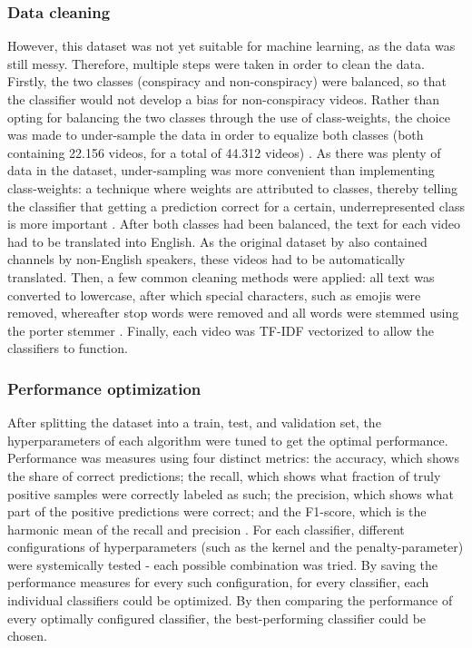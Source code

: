 \documentclass[../main.tex]{subfiles}
\begin{document}
\subsubsection{Data cleaning}
However, this dataset was not yet suitable for machine learning, as the data was still messy. Therefore, multiple steps were taken in order to clean the data. Firstly, the two classes (conspiracy and non-conspiracy) were balanced, so that the classifier would not develop a bias for non-conspiracy videos. Rather than opting for balancing the two classes through the use of class-weights, the choice was made to under-sample the data in order to equalize both classes (both containing 22.156 videos, for a total of 44.312 videos) \citep{lemaitre2017imbalanced}. As there was plenty of data in the dataset, under-sampling was more convenient than implementing class-weights: a technique where weights are attributed to classes, thereby telling the classifier that getting a prediction correct for a certain, underrepresented class is more important \citep{sun}. After both classes had been balanced, the text for each video had to be translated into English. As the original dataset by \citet{ledwich2019algorithmic} also contained channels by non-English speakers, these videos had to be automatically translated. Then, a few common cleaning methods were applied: all text was converted to lowercase, after which special characters, such as emojis were removed, whereafter stop words were removed and all words were stemmed using the porter stemmer \citep{karaa2013new}. Finally, each video was TF-IDF vectorized to allow the classifiers to function.

\subsubsection{Performance optimization}
After splitting the dataset into a train, test, and validation set, the hyperparameters of each algorithm were tuned to get the optimal performance. Performance was measures using four distinct metrics: the accuracy, which shows the share of correct predictions; the recall, which shows what fraction of truly positive samples were correctly labeled as such; the precision, which shows what part of the positive predictions were correct; and the F1-score, which is the harmonic mean of the recall and precision \citep{sokolova2009systematic}. For each classifier, different configurations of hyperparameters (such as the kernel and the penalty-parameter) were systemically tested - each possible combination was tried. By saving the performance measures for every such configuration, for every classifier, each individual classifiers could be optimized. By then comparing the performance of every optimally configured classifier, the best-performing classifier could be chosen. 
\end{document}
